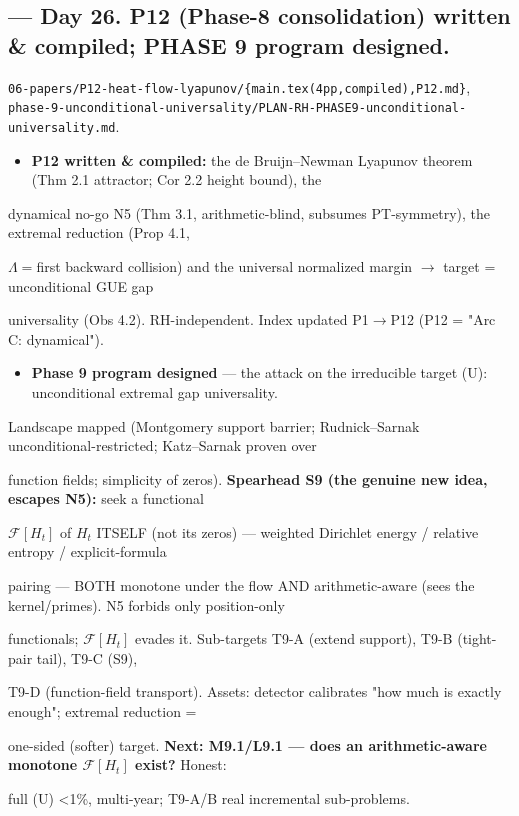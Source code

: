 \documentclass[10pt]{article}
\begin{document}
\subsection*{ --- Day 26. P12 (Phase-8 consolidation) written \& compiled; PHASE 9 program designed.}
\texttt{06-papers/P12-heat-flow-lyapunov/\{main.tex(4pp,compiled),P12.md\}}, \texttt{phase-9-unconditional-universality/PLAN-RH-PHASE9-unconditional-universality.md}.\par
\begin{itemize}
\item \textbf{P12 written \& compiled:} the de Bruijn--Newman Lyapunov theorem (Thm 2.1 attractor; Cor 2.2 height bound), the
\end{itemize}
  dynamical no-go N5 (Thm 3.1, arithmetic-blind, subsumes PT-symmetry), the extremal reduction (Prop 4.1,\par
  $\Lambda=$first backward collision) and the universal normalized margin \ensuremath{\to} target = unconditional GUE gap\par
  universality (Obs 4.2). RH-independent. Index updated P1\ensuremath{\to}P12 (P12 = "Arc C: dynamical").\par
\begin{itemize}
\item \textbf{Phase 9 program designed} --- the attack on the irreducible target (U): unconditional extremal gap universality.
\end{itemize}
  Landscape mapped (Montgomery support barrier; Rudnick--Sarnak unconditional-restricted; Katz--Sarnak proven over\par
  function fields; simplicity of zeros). \textbf{Spearhead S9 (the genuine new idea, escapes N5):} seek a functional\par
  $\mathcal F[H_t]$ of $H_t$ ITSELF (not its zeros) --- weighted Dirichlet energy / relative entropy / explicit-formula\par
  pairing --- BOTH monotone under the flow AND arithmetic-aware (sees the kernel/primes). N5 forbids only position-only\par
  functionals; $\mathcal F[H_t]$ evades it. Sub-targets T9-A (extend support), T9-B (tight-pair tail), T9-C (S9),\par
  T9-D (function-field transport). Assets: detector calibrates "how much is exactly enough"; extremal reduction =\par
  one-sided (softer) target. \textbf{Next: M9.1/L9.1 --- does an arithmetic-aware monotone $\mathcal F[H_t]$ exist?} Honest:\par
  full (U) <1\%, multi-year; T9-A/B real incremental sub-problems.\par
\end{document}
